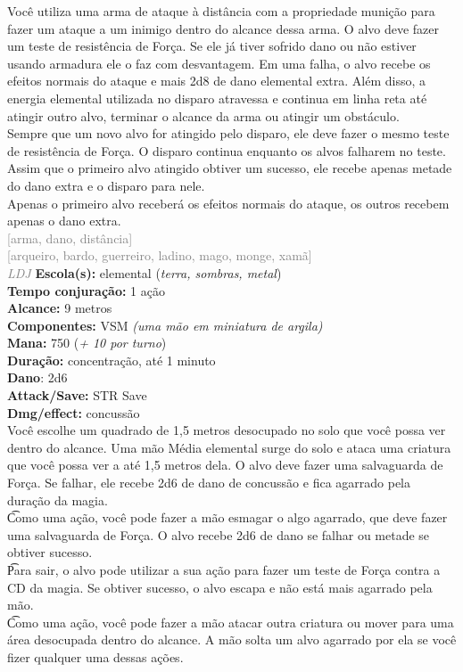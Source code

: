 \documentclass{RPG_Adventure}[2021/10/20]
\begin{document}
{\normalsize Você utiliza uma arma de ataque à distância com a propriedade munição para fazer um ataque a um inimigo dentro do alcance dessa arma. O alvo deve fazer um teste de resistência de Força. Se ele já tiver sofrido dano ou não estiver usando armadura ele o faz com desvantagem. Em uma falha, o alvo recebe os efeitos normais do ataque e mais 2d8 de dano elemental extra. Além disso, a energia elemental utilizada no disparo atravessa e continua em linha reta até atingir outro alvo, terminar o alcance da arma ou atingir um obstáculo.\\Sempre que um novo alvo for atingido pelo disparo, ele deve fazer o mesmo teste de resistência de Força. O disparo continua enquanto os alvos falharem no teste. Assim que o primeiro alvo atingido obtiver um sucesso, ele recebe apenas metade do dano extra e o disparo para nele.\\Apenas o primeiro alvo receberá os efeitos normais do ataque, os outros recebem apenas o dano extra.\\}
{\scriptsize \textcolor{gray}{[arma, dano, distância]\\}}
{\scriptsize \textcolor{gray}{[arqueiro, bardo, guerreiro, ladino, mago, monge, xamã]\\}}
{\tiny \textcolor{gray}{\textit{LDJ}}}\jump{}
{\small \t \textbf{Escola(s):} elemental (\textit{terra, sombras, metal})\\\t \textbf{Tempo conjuração:} 1 ação\\\t \textbf{Alcance:} 9 metros\\\t \textbf{Componentes:} VSM \textit{(uma mão em miniatura de argila)}\\\t \textbf{Mana:} 750 (\textit{+ 10 por turno})\\\t \textbf{Duração:} concentração, até 1 minuto\\\t \textbf{Dano}: 2d6\\\t \textbf{Attack/Save:} STR Save\\\t \textbf{Dmg/effect:} concussão\\}
{\normalsize Você escolhe um quadrado de 1,5 metros desocupado no solo que você possa ver dentro do alcance. Uma mão Média elemental surge do solo e ataca uma criatura que você possa ver a até 1,5 metros dela. O alvo deve fazer uma salvaguarda de Força. Se falhar, ele recebe 2d6 de dano de concussão e fica agarrado pela duração da magia.\\\t Como uma ação, você pode fazer a mão esmagar o algo agarrado, que deve fazer uma salvaguarda de Força. O alvo recebe 2d6 de dano se falhar ou metade se obtiver sucesso.\\\t Para sair, o alvo pode utilizar a sua ação para fazer um teste de Força contra a CD da magia. Se obtiver sucesso, o alvo escapa e não está mais agarrado pela mão.\\\t Como uma ação, você pode fazer a mão atacar outra criatura ou mover para uma área desocupada dentro do alcance. A mão solta um alvo agarrado por ela se você fizer qualquer uma dessas ações.\\}
\end{document}
